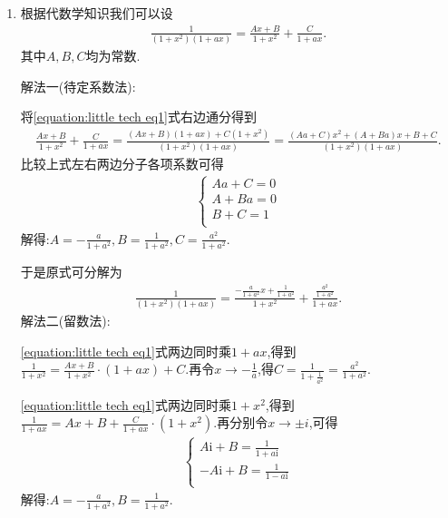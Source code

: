 \documentclass[../../main.tex]{subfiles}
\begin{document}
\begin{solution}\label{将多项式分式分解为其部分因式的和常用方法}
\begin{enumerate}
\item 根据代数学知识我们可以设
\begin{align}\label{equation:little tech eq1}
\frac{1}{\left( 1+x^2 \right) \left( 1+ax \right)}=\frac{Ax+B}{1+x^2}+\frac{C}{1+ax}.  
\end{align}
其中$A,B,C$均为常数.

{\color{blue}解法一(待定系数法):}

将\eqref{equation:little tech eq1}式右边通分得到
\begin{align*}
\frac{Ax+B}{1+x^2}+\frac{C}{1+ax}=\frac{\left( Ax+B \right) \left( 1+ax \right) +C\left( 1+x^2 \right)}{\left( 1+x^2 \right) \left( 1+ax \right)}=\frac{\left( Aa+C \right) x^2+\left( A+Ba \right) x+B+C}{\left( 1+x^2 \right) \left( 1+ax \right)}.
\end{align*}
比较上式左右两边分子各项系数可得
\begin{align*}
\begin{cases}
Aa+C=0\\
A+Ba=0\\
B+C=1\\
\end{cases}
\end{align*}
解得:$A=-\frac{a}{1+a^2},B=\frac{1}{1+a^2},C=\frac{a^2}{1+a^2}$.

于是原式可分解为
\begin{align*}
\frac{1}{\left( 1+x^2 \right) \left( 1+ax \right)}=\frac{-\frac{a}{1+a^2}x+\frac{1}{1+a^2}}{1+x^2}+\frac{\frac{a^2}{1+a^2}}{1+ax}.
\end{align*}
{\color{blue}解法二(留数法):}

\eqref{equation:little tech eq1}式两边同时乘$1+ax$,得到$\frac{1}{1+x^2}=\frac{Ax+B}{1+x^2}\cdot \left( 1+ax \right) +C$.再令$x\to-\frac{1}{a}$,得$C=\frac{1}{1+\frac{1}{a^2}}=\frac{a^2}{1+a^2}$.

\eqref{equation:little tech eq1}式两边同时乘$1+x^2$,得到
$\frac{1}{1+ax}=Ax+B+\frac{C}{1+ax}\cdot \left( 1+x^2 \right)$.再分别令$x\to \pm i$,可得
\begin{align*}
\begin{cases}
A\mathrm{i}+B=\frac{1}{1+a\mathrm{i}}\\
-A\mathrm{i}+B=\frac{1}{1-a\mathrm{i}}\\
\end{cases}
\end{align*}
解得:$A=-\frac{a}{1+a^2},B=\frac{1}{1+a^2}$.


\end{enumerate}
\end{solution}
\end{document}
